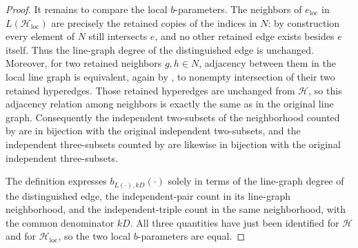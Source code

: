 \begin{proof}
It remains to compare the local $b$-parameters.  The neighbors of
$e_{\mathrm{loc}}$ in $L(\mathcal H_{\mathrm{loc}})$ are precisely the
retained copies of the indices in $N$: by construction every element of $N$
still intersects $e$, and no other retained edge exists besides $e$ itself.
Thus the line-graph degree of the distinguished edge is unchanged.  Moreover,
for two retained neighbors $g,h\in N$, adjacency between them in the local
line graph is equivalent, again by , to
nonempty intersection of their two retained hyperedges.  Those retained
hyperedges are unchanged from $\mathcal H$, so this adjacency relation among
neighbors is exactly the same as in the original line graph.  Consequently
the independent two-subsets of the neighborhood counted by
 are in bijection with the original
independent two-subsets, and the independent three-subsets counted by
 are likewise in bijection with the original
independent three-subsets.

The definition  expresses
$b_{L(\cdot),kD}(\cdot)$ solely in terms of the line-graph degree of the
distinguished edge, the independent-pair count in its line-graph
neighborhood, and the independent-triple count in the same neighborhood,
with the common denominator $kD$.  All three quantities have just been
identified for $\mathcal H$ and for $\mathcal H_{\mathrm{loc}}$, so the two
local $b$-parameters are equal.
\end{proof}
